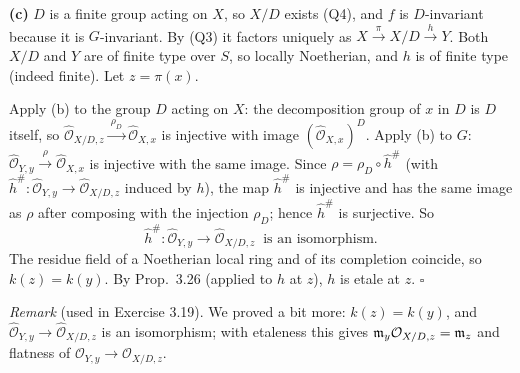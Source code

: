 \documentclass[11pt]{article}
\begin{document}
\textbf{(c)} $D$ is a finite group acting on $X$, so $X/D$ exists (Q4), and $f$ is $D$-invariant because it is $G$-invariant. By (Q3) it factors uniquely as $X\xrightarrow{\pi}X/D\xrightarrow{h}Y$. Both $X/D$ and $Y$ are of finite type over $S$, so locally Noetherian, and $h$ is of finite type (indeed finite). Let $z=\pi(x)$.

Apply (b) to the group $D$ acting on $X$: the decomposition group of $x$ in $D$ is $D$ itself, so $\widehat{\mathcal O}_{X/D,z}\xrightarrow{\ \rho_D\ }\widehat{\mathcal O}_{X,x}$ is injective with image $(\widehat{\mathcal O}_{X,x})^D$. Apply (b) to $G$: $\widehat{\mathcal O}_{Y,y}\xrightarrow{\rho}\widehat{\mathcal O}_{X,x}$ is injective with the same image. Since $\rho=\rho_D\circ\hat h^\#$ (with $\hat h^\#:\widehat{\mathcal O}_{Y,y}\to\widehat{\mathcal O}_{X/D,z}$ induced by $h$), the map $\hat h^\#$ is injective and has the same image as $\rho$ after composing with the injection $\rho_D$; hence $\hat h^\#$ is surjective. So
\[ \hat h^\#:\widehat{\mathcal O}_{Y,y}\to\widehat{\mathcal O}_{X/D,z}\ \text{ is an isomorphism}. \]
The residue field of a Noetherian local ring and of its completion coincide, so $k(z)=k(y)$. By Prop.~3.26 (applied to $h$ at $z$), $h$ is etale at $z$. \hfill$\square$

\emph{Remark} (used in Exercise 3.19). We proved a bit more: $k(z)=k(y)$, and $\widehat{\mathcal O}_{Y,y}\to\widehat{\mathcal O}_{X/D,z}$ is an isomorphism; with etaleness this gives $\mathfrak m_y\mathcal O_{X/D,z}=\mathfrak m_z$ and flatness of $\mathcal O_{Y,y}\to\mathcal O_{X/D,z}$.
\end{document}

